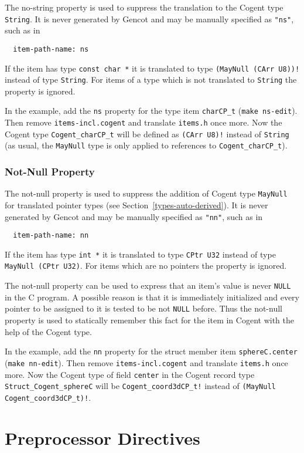 \documentclass[a4paper]{report}
\newcommand{\code}[1]{\textnormal{\texttt{#1}}}
\begin{document}
The no-string property is used to suppress the translation to the Cogent type \code{String}. It is never generated by Gencot
and may be manually specified as \code{"ns"}, such as in 
\begin{verbatim}
  item-path-name: ns
\end{verbatim}
If the item has type \code{const char *} it is translated to type \code{(MayNull (CArr U8))!} instead of type \code{String}.
For items of a type which is not translated to \code{String} the property is ignored.

In the example, add the \code{ns} property for the type item \code{charCP\_t} (\code{make ns-edit}). Then 
remove \code{items-incl.cogent} and translate \code{items.h} once more. Now the Cogent type \code{Cogent\_charCP\_t} will
be defined as \code{(CArr U8)!} instead of \code{String} (as usual, the \code{MayNull} type is only applied to
references to \code{Cogent\_charCP\_t}).

\subsection{Not-Null Property}
\label{types-manprops-nn}

The not-null property is used to suppress the addition of Cogent type \code{MayNull} for translated pointer types (see 
Section~\ref{types-auto-derived}). It is never generated by Gencot and may be manually specified as \code{"nn"}, such as in 
\begin{verbatim}
  item-path-name: nn
\end{verbatim}
If the item has type \code{int *} it is translated to type \code{CPtr U32} instead of type \code{MayNull (CPtr U32)}.
For items which are no pointers the property is ignored.

The not-null property can be used to express that an item's value is never \code{NULL} in the C program. A possible reason
is that it is immediately initialized and every pointer to be assigned to it is tested to be not \code{NULL} before. 
Thus the not-null property is used to statically remember this fact for the item in Cogent with the help of the Cogent
type.

In the example, add the \code{nn} property for the struct member item \code{sphereC.center} (\code{make nn-edit}). Then 
remove \code{items-incl.cogent} and translate \code{items.h} once more. Now the Cogent type of field \code{center} in
the Cogent record type \code{Struct\_Cogent\_sphereC} will be \code{Cogent\_coord3dCP\_t!} instead of 
\code{(MayNull Cogent\_coord3dCP\_t)!}.

\chapter{Preprocessor Directives}
\label{directives}
\end{document}

